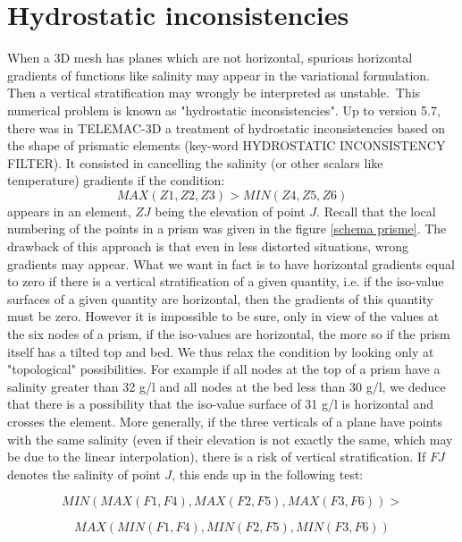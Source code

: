 \section{Hydrostatic inconsistencies}

When a 3D mesh has planes which are not horizontal, spurious horizontal
gradients of functions like salinity may appear in the variational
formulation. Then a vertical stratification may wrongly be interpreted as
unstable.\ This numerical problem is known as "hydrostatic inconsistencies".
Up to version 5.7, there was in TELEMAC-3D a treatment of hydrostatic
inconsistencies based on the shape of prismatic elements (key-word HYDROSTATIC
INCONSISTENCY FILTER). It consisted in cancelling the salinity (or other
scalars like temperature) gradients if the condition:
\begin{equation}
MAX(Z1,Z2,Z3)>MIN(Z4,Z5,Z6)
\end{equation}
%
appears in an element, $ZJ$ being the elevation of point $J$. Recall that the local
numbering of the points in a prism was given in the figure \ref{schema prisme}.
The drawback of this approach is that even in less distorted situations, wrong gradients
may appear. What we want in fact is to have horizontal gradients equal to zero
if there is a vertical stratification of a given quantity, i.e. if the
iso-value surfaces of a given quantity are horizontal, then the gradients of
this quantity must be zero. However it is impossible to be sure, only in view
of the values at the six nodes of a prism, if the iso-values are horizontal,
the more so if the prism itself has a tilted top and bed. We thus relax the
condition by looking only at "topological" possibilities. For example if all
nodes at the top of a prism have a salinity greater than 32 g/l and all nodes
at the bed less than 30 g/l, we deduce that there is a possibility that the
iso-value surface of 31 g/l is horizontal and crosses the element. More
generally, if the three verticals of a plane have points with the same
salinity (even if their elevation is not exactly the same, which may be due to
the linear interpolation), there is a risk of vertical stratification. If $FJ$
denotes the salinity of point $J$, this ends up in the following test:%

\begin{equation}
MIN(MAX(F1,F4),MAX(F2,F5),MAX(F3,F6))>
\end{equation}
%

\begin{equation}
MAX(MIN(F1,F4),MIN(F2,F5),MIN(F3,F6))
\end{equation}


